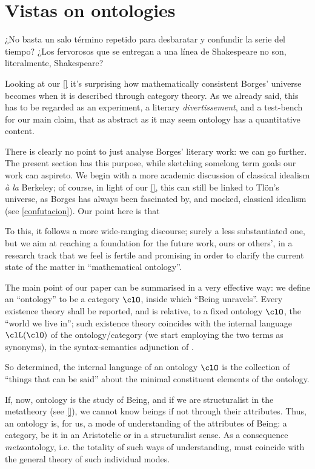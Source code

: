 \section{Vistas on ontologies}
\epigraph{¿No basta un salo término repetido para desbaratar y confundir la serie del tiempo? ¿Los fervorosos que se entregan a una línea de Shakespeare no son, literalmente, Shakespeare?}{\cite{confutacion}}
Looking at our \autoref{} it's surprising how mathematically consistent Borges' universe becomes when it is described through category theory. As we already said, this has to be regarded as an experiment, a literary \emph{divertissement}, and a test-bench for our main claim, that as abstract as it may seem ontology has a quantitative content.

There is clearly no point to just analyse Borges' literary work: we can go further. The present section has this purpose, while sketching somelong term goals our work can aspireto. We begin with a more academic discussion of classical idealism \emph{à la} Berkeley; of course, in light of our \autoref{}, this can still be linked to Tl\"on's universe, as Borges has always been fascinated by, and mocked, classical idealism (see \autoref{confutacion}). Our point here is that  

To this, it follows a more wide-ranging discourse; surely a less substantiated one, but we aim at reaching a foundation for the future work, ours or others', in a research track that we feel is fertile and promising in order to clarify the current state of the matter in ``mathematical ontology''.

The main point of our paper can be summarised in a very effective way: we define an ``ontology'' to be a category $\clO$, inside which ``Being unravels''. Every existence theory shall be reported, and is relative, to a fixed ontology $\clO$, the ``world we live in''; such existence theory coincides with the internal language $\clL(\clO)$ of the ontology/category (we start employing the two terms as synonyms), in the syntax\hyp{}semantics adjunction of \cite{}.

So determined, the internal language of an ontology $\clO$ is the collection of ``things that can be said'' about the minimal constituent elements of the ontology.

If, now, ontology is the study of Being, and if we are structuralist in the metatheory (see \autoref{}), we cannot know beings if not through their attributes. Thus, an ontology is, for us, a mode of understanding of the attributes of Being: a category, be it in an Aristotelic or in a structuralist sense. As a consequence \emph{meta}ontology, i.e. the totality of such ways of understanding, must coincide with the general theory of such individual modes.

